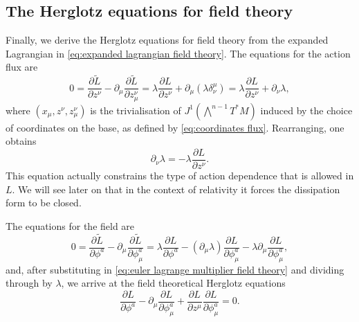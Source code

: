 \documentclass[../main.tex]{subfiles}
\begin{document}
\subsection{The Herglotz equations for field theory}
Finally, we derive the Herglotz equations for field theory from the expanded
Lagrangian  in \cref{eq:expanded lagrangian field theory}. The
equations for the action flux are
\begin{equation*}
	0 = \frac{\partial \tilde{L}}{\partial z^\nu} - \partial_\mu \frac{\partial
	\tilde{L}}{\partial z^\nu_\mu} = \lambda \frac{\partial L}{\partial z^\nu} +
	\partial_\mu(\lambda \delta_\nu^\mu) = \lambda \frac{\partial L}{\partial z^\nu} +
	\partial_\nu \lambda,
\end{equation*}
where \((x_\mu, z^\nu, z^\nu_\mu)\) is the trivialisation of \(J^1(\bigwedge^{n-1}T^\ast M) \) induced by the choice of coordinates on the base, as defined by \cref{eq:coordinates flux}.
Rearranging, one obtains
\begin{equation} \label{eq:euler lagrange multiplier field theory}
	\partial_\nu \lambda = - \lambda \frac{\partial L}{\partial z^\nu}. 
\end{equation}
This equation actually constrains the type of action dependence that is allowed
in \( L \). We will see later on that in the context of relativity it forces the
dissipation form to be closed. 

The equations for the field are
\begin{equation*}
	0 = \frac{\partial \tilde{L}}{\partial \phi^a} - \partial_\mu \frac{\partial
	\tilde{L}}{\partial\phi^a_\mu} = \lambda \frac{\partial L}{\partial \phi^a} -
	(\partial_\mu \lambda) \frac{\partial L}{\partial\phi^a_\mu} - \lambda
	\partial_\mu \frac{\partial L}{\partial\phi^a_\mu},
\end{equation*}
and, after substituting in \cref{eq:euler lagrange multiplier field theory} and dividing
through by \( \lambda \), we arrive at the field theoretical Herglotz equations
\begin{equation} \label{eq:herglotz field theory}
	\frac{\partial L}{\partial \phi^a} - \partial_\mu \frac{\partial
	L}{\partial\phi^a_\mu} + \frac{\partial L}{\partial z^\mu} \frac{\partial
L}{\partial\phi^a_\mu} = 0. 
\end{equation}
\end{document}
